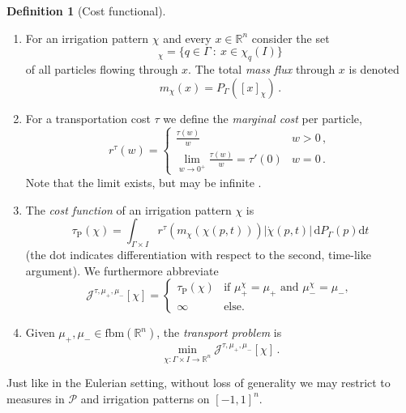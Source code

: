 \documentclass[10pt,a4paper,oneside,final]{article}
\newcommand{\R}{{\mathbb{R}}}
\newcommand{\de}{{\mathrm{d}}}
\newcommand{\fbm}{{\mathrm{fbm}}}
\newcommand{\prob}{{\mathcal{P}}}
\newcommand{\reSpace}{\Gamma}
\newcommand{\reMeasure}{P_{\reSpace}}
\newcommand{\JEn}{{\mathcal{J}}}
\newcommand{\JEnMMS}[1][\tau]{#1_{\mathrm{P}}}%
\numberwithin{equation}{section}
\theoremstyle{plain}
\theoremstyle{definition}
\newtheorem{definition}[theorem]{Definition}
\theoremstyle{remark}
\begin{document}
\begin{definition}[Cost functional]\label{def:patternCost}
\begin{enumerate}
\item For an irrigation pattern $\chi$ and every $x\in\R^n$ consider the set
\begin{equation*}
[x]_\chi = \{q \in \reSpace \ : \ x \in \chi_q(I)\}\label{eq:solidarity_classes}
\end{equation*}
of all particles flowing through $x$.
The total \emph{mass flux} through $x$ is denoted
\begin{equation*}
m_\chi(x) = \reMeasure([x]_\chi)\,.
\end{equation*}
\item For a transportation cost $\tau$ we define the \emph{marginal cost} per particle,
\begin{displaymath}
 r^\tau(w) = \begin{cases}
              \frac{\tau(w)}{w} & w > 0\,,\\
              \lim_{w \to 0^+} \frac{\tau(w)}{w} = \tau'(0) & w = 0\,.
             \end{cases}
\end{displaymath}
Note that the limit exists, but may be infinite \cite[Thm.\,16.3.3]{Ku09}.
\item The \emph{cost function} of an irrigation pattern $\chi$ is
\begin{displaymath}
 \JEnMMS(\chi) = \int_{\reSpace \times I} r^\tau(m_\chi(\chi(p,t)))|\dot\chi(p,t)|\,\de\reMeasure(p)\de t
\end{displaymath}
(the dot indicates differentiation with respect to the second, time-like argument).
We furthermore abbreviate
\begin{equation*}
\JEn^{\tau,\mu_+,\mu_-}[\chi]
=\begin{cases}
\JEnMMS(\chi)&\text{if $\mu_+^\chi = \mu_+$ and $\mu_-^\chi = \mu_-$},\\
\infty&\text{else.}
\end{cases}\end{equation*}
\item Given $\mu_+,\mu_- \in \fbm(\R^n)$, the \emph{transport problem} is
\begin{equation*}
 \min_{\chi:\reSpace\times I\to\R^n}\JEn^{\tau,\mu_+,\mu_-}[\chi]\,.
\end{equation*}
\end{enumerate}
\end{definition}

Just like in the Eulerian setting, without loss of generality we may restrict to measures in $\prob$ and irrigation patterns on $[-1,1]^n$.
\end{document}
